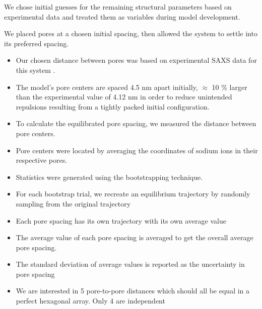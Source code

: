 \documentclass{article}
\begin{document}
  We chose initial guesses for the remaining structural parameters based on 
  experimental data and treated them as variables during model development.

  We placed pores at a chosen initial spacing, then allowed the system to settle 
  into its preferred spacing. 
  \begin{itemize}
    \item Our chosen distance between pores was based on experimental SAXS data for
    this system \cite{feng_thin_2016}.
    \item The model's pore centers are spaced 4.5 nm apart initially, $\approx$ 10 \% larger
    than the experimental value of 4.12 nm in order to reduce unintended repulsions 
    resulting from a tightly packed initial configuration.
    \item To calculate the equilibrated pore spacing, we measured the distance between pore
    centers.
    \item Pore centers were located by averaging the coordinates of sodium ions in their 
    respective pores.
    \item Statistics were generated using the bootstrapping technique.
    \item For each bootstrap trial, we recreate an equilibrium trajectory by randomly 
    sampling from the original trajectory
    \item Each pore spacing has its own trajectory with its own average value
    \item The average value of each pore spacing is averaged to get the overall
    average pore spacing. 
    \item The standard deviation of average values is reported as the uncertainty in pore spacing
    \item We are interested in 5 pore-to-pore distances which should all be equal in 
    a perfect hexagonal array. Only 4 are independent  
  \end{itemize}
  
\end{document}
